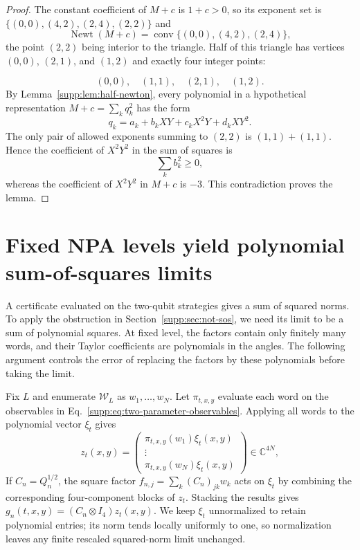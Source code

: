 \documentclass[aps,prl,onecolumn,10pt,superscriptaddress,nofootinbib,longbibliography]{revtex4-2}
\theoremstyle{remark}
\newcommand{\C}{\mathbb C}
\newcommand{\Newt}{\operatorname{Newt}}
\begin{document}
\begin{proof}
The constant coefficient of $M+c$ is $1+c>0$, so its exponent set is $\{(0,0),(4,2),(2,4),(2,2)\}$ and
\begin{equation}
\Newt(M+c)=\operatorname{conv}\{(0,0),(4,2),(2,4)\},
\label{supp:eq:motzkin-newton}
\end{equation}
the point $(2,2)$ being interior to the triangle. Half of this triangle has vertices $(0,0)$, $(2,1)$, and $(1,2)$ and exactly four integer points:

\begin{equation}
(0,0),\quad(1,1),\quad(2,1),\quad(1,2).
\label{supp:eq:half-triangle-points}
\end{equation}
By Lemma~\ref{supp:lem:half-newton}, every polynomial in a hypothetical representation $M+c=\sum_kq_k^2$ has the form
\begin{equation}
q_k=a_k+b_kXY+c_kX^2Y+d_kXY^2.
\label{supp:eq:qk-form}
\end{equation}
The only pair of allowed exponents summing to $(2,2)$ is $(1,1)+(1,1)$. Hence the coefficient of $X^2Y^2$ in the sum of squares is
\begin{equation}
\sum_kb_k^2\geq0,
\label{supp:eq:positive-middle-coefficient}
\end{equation}
whereas the coefficient of $X^2Y^2$ in $M+c$ is $-3$. This contradiction proves the lemma.
\end{proof}

\section{Fixed NPA levels yield polynomial sum-of-squares limits}
\label{supp:sec:compactness}

A certificate evaluated on the two-qubit strategies gives a sum of squared norms. To apply the obstruction in Section~\ref{supp:sec:not-sos}, we need its limit to be a sum of polynomial squares. At fixed level, the factors contain only finitely many words, and their Taylor coefficients are polynomials in the angles. The following argument controls the error of replacing the factors by these polynomials before taking the limit.

Fix $L$ and enumerate $\mathcal W_L$ as $w_1,\ldots,w_N$. Let $\pi_{t,x,y}$ evaluate each word on the observables in Eq.~\eqref{supp:eq:two-parameter-observables}. Applying all words to the polynomial vector $\xi_t$ gives
\begin{equation}
z_t(x,y)=
\begin{pmatrix}
\pi_{t,x,y}(w_1)\xi_t(x,y)\\
\vdots\\
\pi_{t,x,y}(w_N)\xi_t(x,y)
\end{pmatrix}
\in\C^{4N},
\label{supp:eq:z-vector}
\end{equation}
If $C_n=Q_n^{1/2}$, the square factor $f_{n,j}=\sum_k(C_n)_{jk}w_k$ acts on $\xi_t$ by combining the corresponding four-component blocks of $z_t$. Stacking the results gives $g_n(t,x,y)=(C_n\otimes I_4)z_t(x,y)$. We keep $\xi_t$ unnormalized to retain polynomial entries; its norm tends locally uniformly to one, so normalization leaves any finite rescaled squared-norm limit unchanged.
\end{document}
